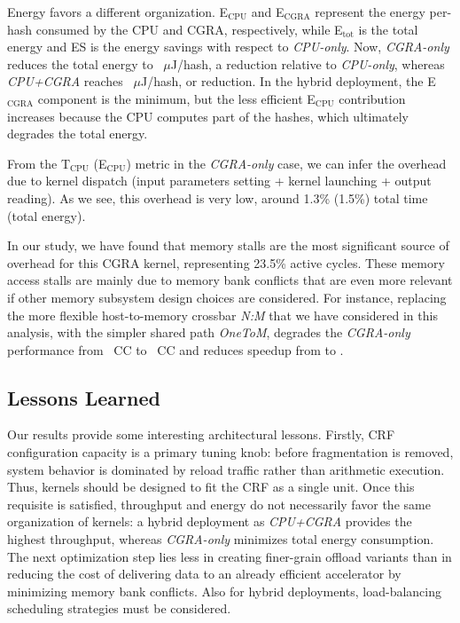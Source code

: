 Energy favors a different organization. E$_{\text{CPU}}$ and E$_{\text{CGRA}}$ represent the energy per-hash consumed by the CPU and CGRA, respectively, while E$_{\text{tot}}$ is the total energy and ES is the energy savings with respect to \textit{CPU-only}. Now, \textit{CGRA-only} reduces the total energy to {\MetricMerkleOffloadTotalEnergyPerHashUJ}~$\mu$J/hash, a \pct{\MetricMerkleOffloadEnergySavingsPct} reduction relative to \textit{CPU-only}, whereas \textit{CPU+CGRA} reaches {\MetricMerkleCoexecTotalEnergyPerHashUJ}~$\mu$J/hash, or \pct{\MetricMerkleCoexecEnergySavingsPct} reduction. In the hybrid deployment, the E$_{\text{CGRA}}$ component is the minimum, but the less efficient E$_{\text{CPU}}$ contribution increases because the CPU computes part of the hashes, which ultimately degrades the total energy.

From  the T$_{\text{CPU}}$ (E$_{\text{CPU}}$) metric in the \textit{CGRA-only} case, we can infer the overhead due to kernel dispatch (input parameters setting + kernel launching + output reading). As we see, this overhead is very low, around 1.3\% (1.5\%) total time (total energy).

In our study, we have found that memory stalls are the most significant source of overhead for this CGRA kernel, representing 23.5\% active cycles. These memory access stalls are mainly due to memory bank conflicts that are even more relevant if other memory subsystem design choices are considered.
For instance, replacing the more flexible host-to-memory crossbar \textit{N:M} that we have considered in this analysis, with the simpler shared path \textit{OneToM}, degrades the \textit{CGRA-only} performance
from \MetricRtlCgraOnlyCC~CC to \MetricRtlCgraOnlyOneToMCC~CC and reduces speedup from \timex{\MetricMerkleOffloadProjectedSpeedup} to .

\subsection{Lessons Learned}
\label{subsec:discussion}

Our results provide some interesting architectural lessons. Firstly, CRF configuration capacity is a primary tuning knob: before fragmentation is removed, system behavior is dominated by reload traffic rather than arithmetic execution. Thus, kernels should be designed to fit the CRF as a single unit. Once this requisite is satisfied, throughput and energy do not necessarily favor the same organization of kernels: a hybrid deployment as \textit{CPU+CGRA} provides the highest throughput, whereas \textit{CGRA-only} minimizes total energy consumption. The next optimization step lies less in creating finer-grain offload variants than in reducing the cost of delivering data to an already efficient accelerator by minimizing memory bank conflicts.
Also for hybrid deployments, load-balancing scheduling strategies must be considered.
